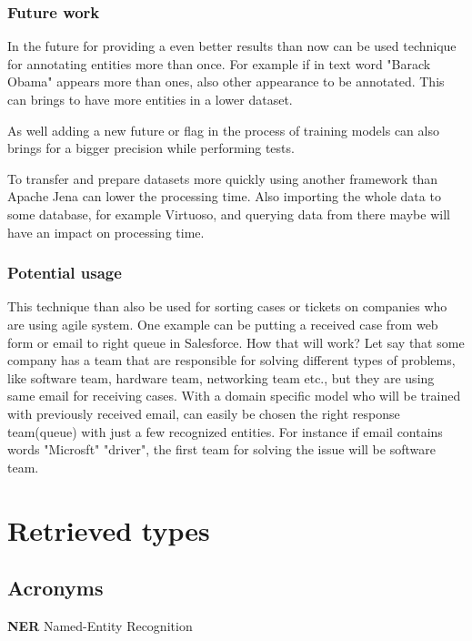 \documentclass[thesis=M,english]{FITthesis}[2018/05/30]
\begin{document}
\begin{conclusion}
\subsection{Future work}
	
	 In the future for providing a even better results than now can be used technique for annotating entities more than once. For example if in text word "Barack Obama" appears more than ones, also other appearance to be annotated. This can brings to have more entities in a lower dataset.
	 
	 As well adding a new future or flag in the process of training models can also brings for a bigger precision while performing tests. 
	 
	 To transfer and prepare datasets more quickly using another framework than Apache Jena can lower the processing time. Also importing the whole data to some database, for example Virtuoso, and querying data from there maybe will have an impact on processing time.


\subsection{Potential usage}

	This technique than also be used for sorting cases or tickets on companies who are using agile system. One example can be putting a received case from web form or email to right queue in Salesforce. How that will work? Let say that some company has a team that are responsible for solving different types of problems, like software team, hardware team, networking team etc., but they are using same email for receiving cases. With a domain specific model who will be trained with previously received email, can easily be chosen the right response team(queue) with just a few recognized entities. For instance if email contains words "Microsft" "driver", the first team for solving the issue will be software team.

\end{conclusion}






\appendix
\chapter{Retrieved types}

\section{Acronyms}
\textbf{NER} Named-Entity Recognition
\end{document}
